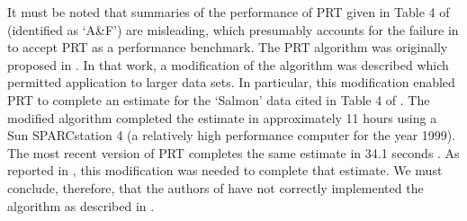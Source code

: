 \documentclass[twoside,10pt,twocolumn]{article}
\begin{document}
It must be noted that summaries of the performance of PRT given in Table 4 of \citet{Chou2012} (identified 
as `A\&F') are misleading, which presumably accounts for the failure in \citet{Chou2012} to accept PRT as a 
performance benchmark. The PRT algorithm was originally proposed in \citet{almudevar99}. In that work, a 
modification of the algorithm was described which permitted application to larger data sets. In particular, 
this modification enabled PRT to complete an estimate for the `Salmon' data cited in Table 4 of 
\citet{Chou2012}. The modified algorithm completed the estimate in approximately 11 hours using a Sun 
SPARCstation 4 (a relatively high performance computer for the year 1999). The most recent version of PRT 
completes the same estimate in 34.1 seconds \citep{alm&and11}. As reported in \citet{almudevar99}, this 
modification was needed to complete that estimate. We must conclude, therefore, that the authors of 
\citet{Chou2012} have not correctly implemented the algorithm as described in \citet{almudevar99}. 




{\footnotesize
}
\end{document}
